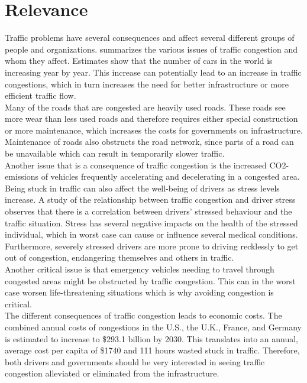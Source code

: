 \section{Relevance}
Traffic problems have several consequences and affect several different groups of people and organizations.  summarizes the various issues of traffic congestion and whom they affect. Estimates show that the number of cars in the world is increasing year by year\cite{WardsAuto:CarPopulation}. This increase can potentially lead to an increase in traffic congestions, which in turn increases the need for better infrastructure or more efficient traffic flow.
\\
Many of the roads that are congested are heavily used roads. These roads see more wear than less used roads and therefore requires either special construction or more maintenance, which increases the costs for governments on infrastructure. Maintenance of roads also obstructs the road network, since parts of a road can be unavailable which can result in temporarily slower traffic.
\\
Another issue that is a consequence of traffic congestion is the increased CO2-emissions of vehicles frequently accelerating and decelerating in a congested area\cite{BarthBoriboonsomsin2009}.
\\
Being stuck in traffic can also affect the well-being of drivers as stress levels increase. A study of the relationship between traffic congestion and driver stress observes that there is a correlation between drivers' stressed behaviour and the traffic situation\cite{HennesyWiesenthal1997,StokolsNovacoStokolsCampell1978}. Stress has several negative impacts on the health of the stressed individual, which in worst case can cause or influence several medical conditions. Furthermore, severely stressed drivers are more prone to driving recklessly to get out of congestion, endangering themselves and others in traffic\cite{Shinar1998}.
\\
Another critical issue is that emergency vehicles needing to travel through congested areas might be obstructed by traffic congestion. This can in the worst case worsen life-threatening situations which is why avoiding congestion is critical.
\\
The different consequences of traffic congestion leads to economic costs. The combined annual costs of congestions in the U.S., the U.K., France, and Germany is estimated to increase to \$293.1 billion by 2030\cite{INRIX2013}. This translates into an annual, average cost per capita of \$1740 and 111 hours wasted stuck in traffic. Therefore, both drivers and governments should be very interested in seeing traffic congestion alleviated or eliminated from the infrastructure.

